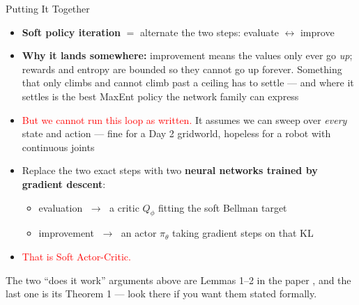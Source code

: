 \begin{frame}{Putting It Together}
\begin{itemize}
    \item \textbf{Soft policy iteration} $=$ alternate the two steps: evaluate $\longleftrightarrow$ improve
    \vspace{0.4em}
    \item \textbf{Why it lands somewhere:} improvement means the values only ever go \emph{up}; rewards and entropy are bounded so they cannot go up forever. Something that only climbs and cannot climb past a ceiling has to settle --- and where it settles is the best MaxEnt policy the network family can express
    \vspace{0.6em}
    \item \textcolor{red}{But we cannot run this loop as written.} It assumes we can sweep over \emph{every} state and action --- fine for a Day 2 gridworld, hopeless for a robot with continuous joints
    \vspace{0.4em}
    \item[$\Rightarrow$] Replace the two exact steps with two \textbf{neural networks trained by gradient descent}:
    \begin{itemize}
        \item evaluation $\;\to\;$ a critic $Q_\phi$ fitting the soft Bellman target
        \item improvement $\;\to\;$ an actor $\pi_\theta$ taking gradient steps on that KL
    \end{itemize}
    \item[] \textcolor{red}{That is Soft Actor-Critic.}
\end{itemize}
\vspace{0.1em}
{\footnotesize The two ``does it work'' arguments above are Lemmas 1--2 in the paper , and the last one is its Theorem 1 --- look there if you want them stated formally.}
\end{frame}
